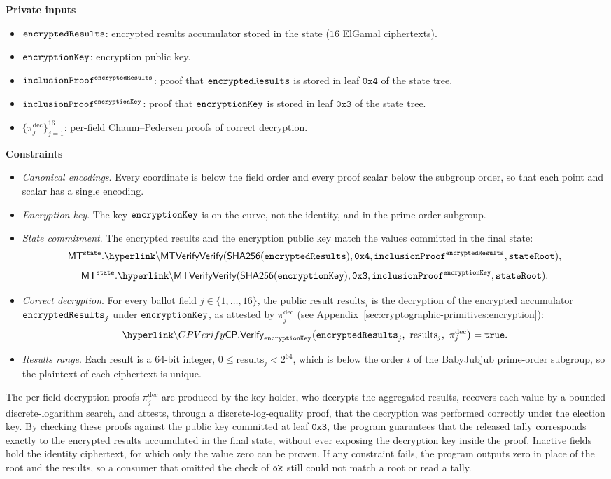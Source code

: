 	\noi \textbf{Private inputs}
	\begin{itemize}
		\item \private $\texttt{encryptedResults}$: encrypted results accumulator stored in the state ($16$ ElGamal ciphertexts).
		\item \private $\texttt{encryptionKey}$: encryption public key.
		\item \private $\texttt{inclusionProof}^{\texttt{encryptedResults}}$: proof that $\texttt{encryptedResults}$ is stored in leaf $\texttt{0x4}$ of the state tree.
		\item \private $\texttt{inclusionProof}^{\texttt{encryptionKey}}$: proof that $\texttt{encryptionKey}$ is stored in leaf $\texttt{0x3}$ of the state tree.
		\item \private $\{\pi^{\mathrm{dec}}_j\}_{j=1}^{16}$: per-field Chaum--Pedersen proofs of correct decryption.
	\end{itemize}
	\textbf{Constraints}
	\begin{itemize}
		\item \emph{Canonical encodings}. Every coordinate is below the field order and every proof scalar below the subgroup order, so that each point and scalar has a single encoding.
		\item \emph{Encryption key}. The key $\texttt{encryptionKey}$ is on the curve, not the identity, and in the prime-order subgroup.
		\item \emph{State commitment}. The encrypted results and the encryption public key match the values committed in the final state:
		\[\stateTree.\hlget{\MTVerify}(\Sha(\encresults), \texttt{0x4}, \merkleInclusionPf^{\encresults}, \stateroot),\]
		\[\stateTree.\hlget{\MTVerify}(\Sha(\epk), \texttt{0x3}, \merkleInclusionPf^{\epk}, \stateroot).\]
		\item \emph{Correct decryption}. For every ballot field $j \in \{1, \dots, 16\}$, the public result $\text{results}_j$ is the decryption of the encrypted accumulator $\texttt{encryptedResults}_j$ under $\texttt{encryptionKey}$, as attested by $\pi^{\mathrm{dec}}_j$ (see Appendix~\ref{sec:cryptographic-primitives:encryption}):
		\[\hlget{\CPVerify}_{\epk}\bigl(\encresults_j,\ \text{results}_j,\ \pi^{\mathrm{dec}}_j\bigr) = \true.\]
		\item \emph{Results range}. Each result is a 64-bit integer, $0 \le \text{results}_j < 2^{64}$, which is below the order $t$ of the BabyJubjub prime-order subgroup, so the plaintext of each ciphertext is unique.
	\end{itemize}
%
\noi The per-field decryption proofs $\pi^{\mathrm{dec}}_j$ are produced by the key holder, who decrypts the aggregated results, recovers each value by a bounded discrete-logarithm search, and attests, through a discrete-log-equality proof, that the decryption was performed correctly under the election key. By checking these proofs against the public key committed at leaf $\texttt{0x3}$, the program guarantees that the released tally corresponds exactly to the encrypted results accumulated in the final state, without ever exposing the decryption key inside the proof. Inactive fields hold the identity ciphertext, for which only the value zero can be proven. If any constraint fails, the program outputs zero in place of the root and the results, so a consumer that omitted the check of $\texttt{ok}$ still could not match a root or read a tally.

